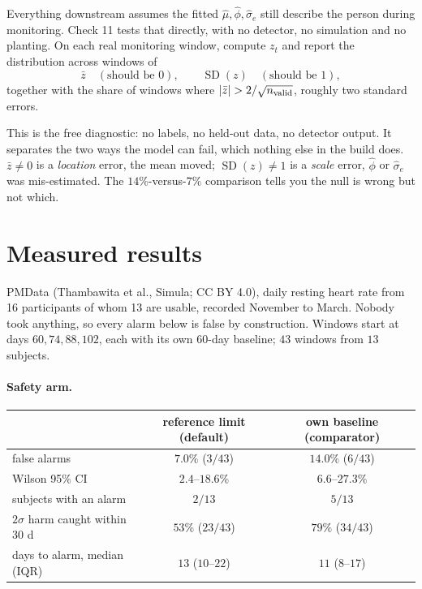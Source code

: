 \documentclass{article}
\theoremstyle{plain}
\theoremstyle{definition}
\theoremstyle{remark}
\numberwithin{equation}{section}
\begin{document}
Everything downstream assumes the fitted $\hat\mu, \hat\phi, \hat\sigma_e$
still describe the person during monitoring. Check 11 tests that directly, with
no detector, no simulation and no planting. On each real monitoring window,
compute $z_t$ and report the distribution across windows of
\[
  \bar z \quad (\text{should be } 0),
  \qquad
  \operatorname{SD}(z) \quad (\text{should be } 1),
\]
together with the share of windows where
$\abs{\bar z} > 2/\sqrt{n_{\mathrm{valid}}}$, roughly two standard errors.

This is the free diagnostic: no labels, no held-out data, no detector output.
It separates the two ways the model can fail, which nothing else in the build
does. $\bar z \ne 0$ is a \emph{location} error, the mean moved;
$\operatorname{SD}(z) \ne 1$ is a \emph{scale} error, $\hat\phi$ or
$\hat\sigma_e$ was mis-estimated. The $14\%$-versus-$7\%$ comparison tells you
the null is wrong but not which.

\section{Measured results}
\label{sec:measured}

PMData (Thambawita et al., Simula; CC BY 4.0), daily resting heart rate from 16
participants of whom 13 are usable, recorded November to March. Nobody took
anything, so every alarm below is false by construction. Windows start at days
$60, 74, 88, 102$, each with its own 60-day baseline; $43$ windows from $13$
subjects.

\paragraph{Safety arm.}
\begin{center}
\begin{tabular}{lcc}
 & reference limit (default) & own baseline (comparator) \\
\hline
false alarms & $7.0\%$ ($3/43$) & $14.0\%$ ($6/43$) \\
Wilson 95\% CI & $2.4$--$18.6\%$ & $6.6$--$27.3\%$ \\
subjects with an alarm & $2/13$ & $5/13$ \\
$2\sigma$ harm caught within 30 d & $53\%$ ($23/43$) & $79\%$ ($34/43$) \\
days to alarm, median (IQR) & $13$ ($10$--$22$) & $11$ ($8$--$17$) \\
\end{tabular}
\end{center}
\end{document}
